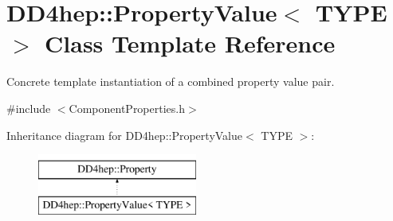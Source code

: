 \hypertarget{class_d_d4hep_1_1_property_value}{}\section{D\+D4hep\+:\+:Property\+Value$<$ T\+Y\+PE $>$ Class Template Reference}
\label{class_d_d4hep_1_1_property_value}


Concrete template instantiation of a combined property value pair.  




{\ttfamily \#include $<$Component\+Properties.\+h$>$}

Inheritance diagram for D\+D4hep\+:\+:Property\+Value$<$ T\+Y\+PE $>$\+:\begin{figure}[H]
\begin{center}
\leavevmode
\includegraphics[height=2.000000cm]{class_d_d4hep_1_1_property_value}
\end{center}
\end{figure}
